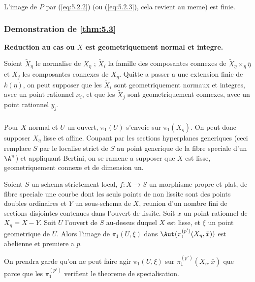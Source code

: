 \begin{theorem}
\label{thm:5.3}
L'image de $P$ par (\ref{eq:5.2.2}) (ou (\ref{eq:5.2.3}), cela revient au meme) est finie.
\end{theorem}

\subsubsection{Demonstration de \ref{thm:5.3}}
\label{subsubsec:5.3.1}
\textbf{Reduction au cas ou $X$ est geometriquement normal et integre.}

Soient $\tilde{X}_\eta$ le normalise de $X_\eta$ ; $\tilde{X}_i$ la famille des composantes connexes de $\tilde{X}_\eta \times_\eta \bar{\eta}$ et $X_j$ les composantes connexes de $X_{\bar{\eta}}$. Quitte a passer a une extension finie de $k(\eta)$, on peut supposer que les $\tilde{X}_i$ sont geometriquement normaux et integres, avec un point rationnel $x_i$, et que les $\tilde{X}_j$ sont geometriquement connexes, avec un point rationnel $y_j$.

\subsubsection{}
\label{subsubsec:5.3.2}
Pour $X$ normal et $U$ un ouvert, $\pi_1(U)$ s'envoie sur $\pi_1(X_{\bar{\eta}})$. On peut donc supposer $X_\eta$ lisse et affine. Coupant par les sections hyperplanes generiques (ceci remplace $S$ par le localise strict de $S$ au point generique de la fibre speciale d'un $\A^n$) et appliquant Bertini, on se ramene a supposer que $X$ est lisse, geometriquement connexe et de dimension un.

\begin{theorem}
\label{thm:5.4}
Soient $S$ un schema strictement local, $f: X \to S$ un morphisme propre et plat, de fibre speciale une courbe dont les seuls points de non lissite sont des points doubles ordinaires et $Y$ un sous-schema de $X$, reunion d'un nombre fini de sections disjointes contenues dans l'ouvert de lissite. Soit $x$ un point rationnel de $X_\eta = X - Y$. Soit $U$ l'ouvert de $S$ au-dessus duquel $X$ est lisse, et $\xi$ un point geometrique de $U$. Alors l'image de $\pi_1(U, \xi)$ dans $\Aut(\pi_1^{(p')}(X_{\bar{\eta}}, \bar{x}))$ est abelienne et premiere a $p$.
\end{theorem}

On prendra garde qu'on ne peut faire agir $\pi_1(U, \xi)$ sur $\pi_1^{(p')}(X_{\bar{\eta}}, \bar{x})$ que parce que les $\pi_1^{(p')}$ verifient le theoreme de specialisation.

